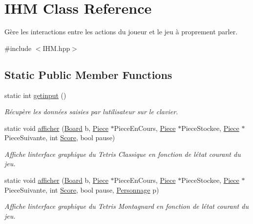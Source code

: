 \hypertarget{classIHM}{}\section{I\+HM Class Reference}
\label{classIHM}


Gère les interactions entre les actions du joueur et le jeu à proprement parler.  




{\ttfamily \#include $<$I\+H\+M.\+hpp$>$}

\subsection*{Static Public Member Functions}
\begin{DoxyCompactItemize}
\item 
static int \hyperlink{classIHM_a87654cde450f04cacddaf7a781f5300c}{getinput} ()
\begin{DoxyCompactList}\small\item\em Récupère les données saisies par l\textquotesingle{}utilisateur sur le clavier. \end{DoxyCompactList}\item 
static void \hyperlink{classIHM_a48abb3aee5c33a71f6fc2c3528f99afb}{afficher} (\hyperlink{classBoard}{Board} b, \hyperlink{classPiece}{Piece} $\ast$Piece\+En\+Cours, \hyperlink{classPiece}{Piece} $\ast$Piece\+Stockee, \hyperlink{classPiece}{Piece} $\ast$Piece\+Suivante, int \hyperlink{classScore}{Score}, bool pause)
\begin{DoxyCompactList}\small\item\em Affiche l\textquotesingle{}interface graphique du Tetris Classique en fonction de l\textquotesingle{}état courant du jeu. \end{DoxyCompactList}\item 
static void \hyperlink{classIHM_afe38f71bf414ddd7e934174657c175e3}{afficher} (\hyperlink{classBoard}{Board} b, \hyperlink{classPiece}{Piece} $\ast$Piece\+En\+Cours, \hyperlink{classPiece}{Piece} $\ast$Piece\+Stockee, \hyperlink{classPiece}{Piece} $\ast$Piece\+Suivante, int \hyperlink{classScore}{Score}, bool pause, \hyperlink{classPersonnage}{Personnage} p)
\begin{DoxyCompactList}\small\item\em Affiche l\textquotesingle{}interface graphique du Tetris Montagnard en fonction de l\textquotesingle{}état courant du jeu. \end{DoxyCompactList}\item 

\end{DoxyCompactItemize}
